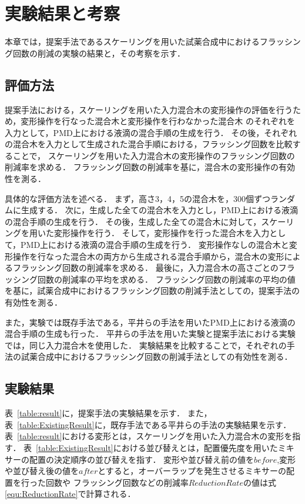 \chapter{実験結果と考察}
本章では，提案手法であるスケーリングを用いた試薬合成中におけるフラッシング回数の削減の実験の結果と，その考察を示す．

\section{評価方法}
提案手法における，スケーリングを用いた入力混合木の変形操作の評価を行うため，変形操作を行なった混合木と変形操作を行わなかった混合木
のそれぞれを入力として，PMD上における液滴の混合手順の生成を行う．
その後，それぞれの混合木を入力として生成された混合手順における，フラッシング回数を比較することで，
スケーリングを用いた入力混合木の変形操作のフラッシング回数の削減率を求める．
フラッシング回数の削減率を基に，混合木の変形操作の有効性を測る．

具体的な評価方法を述べる．
まず，高さ3，4，5の混合木を，300個ずつランダムに生成する．
次に，生成した全ての混合木を入力とし，PMD上における液滴の混合手順の生成を行う．
その後，生成した全ての混合木に対して，スケーリングを用いた変形操作を行う．
そして，変形操作を行った混合木を入力として，PMD上における液滴の混合手順の生成を行う．
変形操作なしの混合木と変形操作を行なった混合木の両方から生成される混合手順から，混合木の変形によるフラッシング回数の削減率を求める．
最後に，入力混合木の高さごとのフラッシング回数の削減率の平均を求める．
フラッシング回数の削減率の平均の値を基に，試薬合成中におけるフラッシング回数の削減手法としての，提案手法の有効性を測る．

また，実験では既存手法である，平井らの手法を用いたPMD上における液滴の混合手順の生成も行った．
平井らの手法を用いた実験と提案手法における実験では，同じ入力混合木を使用した．
実験結果を比較することで，それぞれの手法の試薬合成中におけるフラッシング回数の削減手法としての有効性を測る．

\section{実験結果}
表~\ref{table:result}に，提案手法の実験結果を示す．
また，表~\ref{table:ExistingResult}に，既存手法である平井らの手法の実験結果を示す．
表~\ref{table:result}における変形とは，スケーリングを用いた入力混合木の変形を指す．
表~\ref{table:ExistingResult}における並び替えとは，配置優先度を用いたミキサーの配置の決定順序の並び替えを指す．
変形や並び替え前の値を$before$,変形や並び替え後の値を$after$とすると，オーバーラップを発生させるミキサーの配置を行った回数や
フラッシング回数などの削減率$ReductionRate$の値は式\ref{equ:ReductionRate}で計算される．

